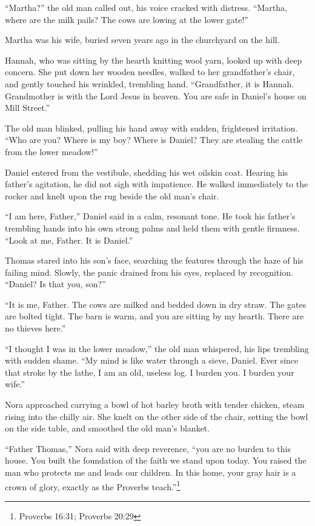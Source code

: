 \documentclass[11pt]{article}
\begin{document}
``Martha?'' the old man called out, his voice cracked with distress. ``Martha, where are the milk pails? The cows are lowing at the lower gate!''

Martha was his wife, buried seven years ago in the churchyard on the hill.

Hannah, who was sitting by the hearth knitting wool yarn, looked up with deep concern. She put down her wooden needles, walked to her grandfather's chair, and gently touched his wrinkled, trembling hand. ``Grandfather, it is Hannah. Grandmother is with the Lord Jesus in heaven. You are safe in Daniel's house on Mill Street.''

The old man blinked, pulling his hand away with sudden, frightened irritation. ``Who are you? Where is my boy? Where is Daniel? They are stealing the cattle from the lower meadow!''

Daniel entered from the vestibule, shedding his wet oilskin coat. Hearing his father's agitation, he did not sigh with impatience. He walked immediately to the rocker and knelt upon the rug beside the old man's chair.

``I am here, Father,'' Daniel said in a calm, resonant tone. He took his father's trembling hands into his own strong palms and held them with gentle firmness. ``Look at me, Father. It is Daniel.''

Thomas stared into his son's face, searching the features through the haze of his failing mind. Slowly, the panic drained from his eyes, replaced by recognition. ``Daniel? Is that you, son?''

``It is me, Father. The cows are milked and bedded down in dry straw. The gates are bolted tight. The barn is warm, and you are sitting by my hearth. There are no thieves here.''

``I thought I was in the lower meadow,'' the old man whispered, his lips trembling with sudden shame. ``My mind is like water through a sieve, Daniel. Ever since that stroke by the lathe, I am an old, useless log. I burden you. I burden your wife.''

Nora approached carrying a bowl of hot barley broth with tender chicken, steam rising into the chilly air. She knelt on the other side of the chair, setting the bowl on the side table, and smoothed the old man's blanket.

``Father Thomas,'' Nora said with deep reverence, ``you are no burden to this house. You built the foundation of the faith we stand upon today. You raised the man who protects me and leads our children. In this home, your gray hair is a crown of glory, exactly as the Proverbs teach.''\footnote{Proverbs 16:31; Proverbs 20:29}
\end{document}
